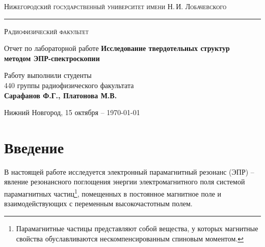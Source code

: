\documentclass[a4paper,14pt]{extarticle}
\def\labauthors{Сарафанов Ф.Г., Платонова М.В.}
\begin{document}
\begin{titlepage}
\begin{center}
{\small\textsc{Нижегородский государственный университет имени Н.\,И. Лобачевского}}
\vskip 2pt \hrule \vskip 3pt
{\small\textsc{Радиофизический факультет}}

\vfill


{{\large Отчет по лабораторной работе}\vskip 12pt {\LARGE \bfseries Исследование твердотельных структур \\[0.2em] методом ЭПР-спектроскопии}}

	
\vspace{2cm}
{\large Работу выполнили студенты \\[-0.25em] 440 группы радиофизического факультата \\[0.5em] {\Large \bfseries \labauthors}}



\end{center}

\vfill
	
	
	
\begin{center}
	{Нижний Новгород, 15 октября -- \today}
\end{center}

\end{titlepage}
\tableofcontents
\newpage



\section*{Введение}
В настоящей работе исследуется электронный парамагнитный резонанс (ЭПР) -- явление резонансного поглощения энергии электромагнитного поля системой парамагнитных частиц\footnote{Парамагнитные частицы представляют собой вещества, у которых магнитные свойства обуславливаются нескомпенсированным спиновым моментом.}, помещенных в постоянное магнитное поле и взаимодействующих с переменным высокочастотным полем.
\end{document}
